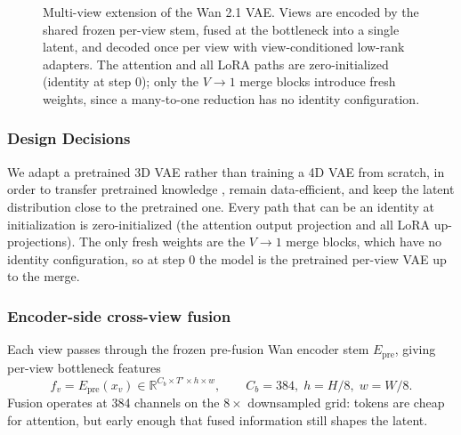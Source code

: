 \begin{figure}[t]
\centering
{}
\caption{Multi-view extension of the Wan 2.1 VAE. Views are encoded by the shared frozen per-view stem, fused at the bottleneck into a single latent, and decoded once per view with view-conditioned low-rank adapters. The attention and all LoRA paths are zero-initialized (identity at step 0); only the $V{\to}1$ merge blocks introduce fresh weights, since a many-to-one reduction has no identity configuration.}
\label{fig:overview}
\end{figure}

\subsubsection{Design Decisions}

We adapt a pretrained 3D VAE rather than training a 4D VAE from scratch, in order to transfer pretrained knowledge \cite{carreira2017quo, blattmann2023align}, remain data-efficient, and keep the latent distribution close to the pretrained one. Every path that can be an identity at initialization is zero-initialized (the attention output projection and all LoRA up-projections). The only fresh weights are the $V{\to}1$ merge blocks, which have no identity configuration, so at step 0 the model is the pretrained per-view VAE up to the merge.

\subsubsection{Encoder-side cross-view fusion}

Each view passes through the frozen pre-fusion Wan encoder stem $E_{\mathrm{pre}}$, giving per-view bottleneck features
\begin{equation}
f_v = E_{\mathrm{pre}}(x_v) \in \mathbb{R}^{C_b \times T' \times h \times w},
\qquad C_b = 384,\; h = H/8,\; w = W/8 .
\end{equation}
Fusion operates at 384 channels on the $8\times$ downsampled grid: tokens are cheap for attention, but early enough that fused information still shapes the latent.

